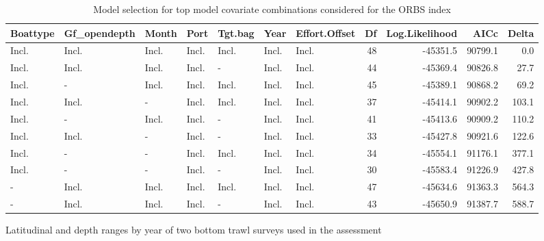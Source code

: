 \documentclass[
]{scrartcl}
\begin{document}
\begin{landscape}
\begingroup
\fontsize{9.0pt}{10.8pt}\selectfont

\begin{longtable}{lllllllrrrr}

\caption{\label{tbl-yelloweye_model_selection_ORBS}Model selection for
top model covariate combinations considered for the ORBS index}

\tabularnewline

\toprule
Boattype & Gf\_opendepth & Month & Port & Tgt.bag & Year & Effort.Offset & Df & Log.Likelihood & AICc & Delta \\ 
\midrule\addlinespace[2.5pt]
Incl. & Incl. & Incl. & Incl. & Incl. & Incl. & Incl. & 48 & -45351.5 & 90799.1 & 0.0 \\ 
Incl. & Incl. & Incl. & Incl. & - & Incl. & Incl. & 44 & -45369.4 & 90826.8 & 27.7 \\ 
Incl. & - & Incl. & Incl. & Incl. & Incl. & Incl. & 45 & -45389.1 & 90868.2 & 69.2 \\ 
Incl. & Incl. & - & Incl. & Incl. & Incl. & Incl. & 37 & -45414.1 & 90902.2 & 103.1 \\ 
Incl. & - & Incl. & Incl. & - & Incl. & Incl. & 41 & -45413.6 & 90909.2 & 110.2 \\ 
Incl. & Incl. & - & Incl. & - & Incl. & Incl. & 33 & -45427.8 & 90921.6 & 122.6 \\ 
Incl. & - & - & Incl. & Incl. & Incl. & Incl. & 34 & -45554.1 & 91176.1 & 377.1 \\ 
Incl. & - & - & Incl. & - & Incl. & Incl. & 30 & -45583.4 & 91226.9 & 427.8 \\ 
- & Incl. & Incl. & Incl. & Incl. & Incl. & Incl. & 47 & -45634.6 & 91363.3 & 564.3 \\ 
- & Incl. & Incl. & Incl. & - & Incl. & Incl. & 43 & -45650.9 & 91387.7 & 588.7 \\ 
\bottomrule

\end{longtable}

\endgroup

\end{landscape}

\newpage{}

\begin{table}

\caption{\label{tbl-srvy-lat-depth}Latitudinal and depth ranges by year
of two bottom trawl surveys used in the assessment}

\centering{

}

\end{table}%
\end{document}
